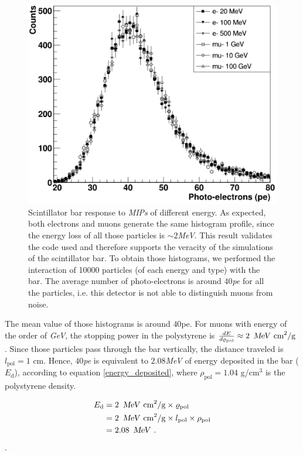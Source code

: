 \documentclass[submitting]{nst}
\begin{document}
\begin{figure}
    \centering
    \includegraphics[scale=0.24]{Figures/MIPS.png}
    \caption{Scintillator bar response to \textsl{MIPs} of different energy. As expected, both electrons and muons generate the same histogram profile, since the energy loss of all those particles is $\sim 2$\textsl{MeV}. This result validates the code used and therefore supports the veracity of the simulations of the scintillator bar.
    To obtain those histograms, we performed the interaction of 10000 particles (of each energy and type) with the bar. The average number of photo-electrons is around $40$\textsl{pe} for all the particles, i.e. this detector is not able to distinguish muons from noise.}
    \label{fig:mips}
\end{figure}

The mean value of those histograms is around $40$pe. For muons with energy of the order of   \textsl{GeV}, the stopping power in the polystyrene is  $\frac{dE}{d\varrho_\mathrm{pol}}\approx 2 \,\text{  \textsl{MeV}  cm}^2\text{/g}$ \cite{MichaelEtal2008}. Since those particles pass through the bar vertically, the distance traveled is $l_\mathrm{pol}=1$ cm. Hence, $40$\textsl{pe} is equivalent to $2.08$\textsl{MeV}  of energy deposited in the bar ($E_\mathrm{d}$), according to equation \ref{energy_deposited}, where $\rho_\mathrm{pol}=1.04$ g/cm$^3$ is the polystyrene density. 

\begin{equation}
\label{energy_deposited}
\begin{split}
    E_\mathrm{d} &= 2 \,\text{  \textsl{MeV}  cm}^2\text{/g} \times \varrho_\mathrm{pol} \\
    &= 2 \,\text{  \textsl{MeV}  cm}^2\text{/g} \times l_\mathrm{pol} \times \rho_\mathrm{pol}\\
    &= \text{2.08} \, \text{  \textsl{MeV} }.
\end{split}
\end{equation}.
\end{document}
